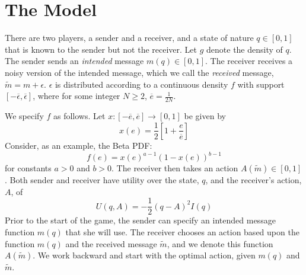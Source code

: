 \documentclass{article}
\begin{document}
\section{The Model}

There are two players, a sender and a receiver, and a state of nature $q\in [ 0,1]$ that is known to the sender but not the receiver. Let $g$ denote the density of $q$. The sender sends an \textit{intended} message $m(q)\in [ 0,1]$. The receiver receives a noisy version of the intended message, which we call the \textit{received} message, $\widetilde{m} =m+\epsilon $. $\epsilon $ is distributed according to a continuous density $ f$ with support $[-\overline{\epsilon },\overline{\epsilon }]$, where for some integer $N\geq2$, $\overline{e}=\frac{1}{2N}$. 

We specify $f$ as follows. Let $x:[-\overline{e},\overline{e}]\rightarrow[0,1]$ be given by
\begin{equation}
	x(e)=\frac{1}{2}\left[1+\frac{e}{\overline{e}}\right]
\end{equation}
Consider, as an example, the Beta PDF:
\begin{equation}
	f(e)=x(e)^{a-1}(1-x(e))^{b-1}
\end{equation}
for constants $a>0$ and $b>0$. The receiver then takes an action $A(\widetilde{m})\in[0,1]$. Both sender and receiver have utility over the state, $q$, and the receiver's action, $A$, of 
\begin{equation}
	U(q,A)=-\frac{1}{2}(q-A)^{2}I(q)
\end{equation}
Prior to the start of the game, the sender can specify an intended message function $m(q)$ that she will use. The receiver chooses an action based upon the function $m(q)$ and the received message $\widetilde{m}$, and we denote this function $A(\widetilde{m})$. We work backward and start with the optimal action, given $m(q)$ and $\widetilde{m}$.
\end{document}
